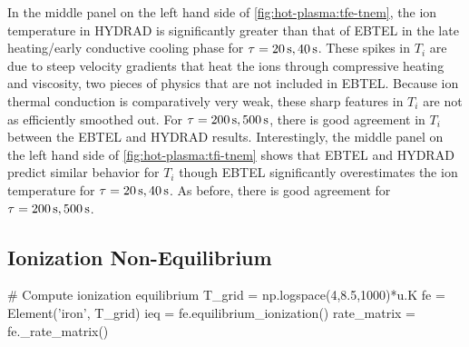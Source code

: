 In the middle panel on the left hand side of \autoref{fig:hot-plasma:tfe-tnem}, the ion temperature in HYDRAD is significantly greater than that of EBTEL in the late heating/early conductive cooling phase for $\tau=\SIlist[list-pair-separator = {, }]{20;40}{\second}$. These spikes in $T_i$ are due to steep velocity gradients that heat the ions through compressive heating and viscosity, two pieces of physics that are not included in EBTEL. Because ion thermal conduction is comparatively very weak, these sharp features in $T_i$ are not as efficiently smoothed out. For $\tau=\SIlist[list-pair-separator = {, }]{200;500}{\second}$, there is good agreement in $T_i$ between the EBTEL and HYDRAD results. Interestingly, the middle panel on the left hand side of \autoref{fig:hot-plasma:tfi-tnem} shows that EBTEL and HYDRAD predict similar behavior for $T_i$ though EBTEL significantly overestimates the ion temperature for $\tau=\SIlist[list-pair-separator = {, }]{20;40}{\second}$. As before, there is good agreement for $\tau=\SIlist[list-pair-separator = {, }]{200;500}{\second}$. 

\subsection{Ionization Non-Equilibrium}\label{hot-plasma:subsec:nei_res}

\begin{pycode}[chapter5]
# Compute ionization equilibrium
T_grid = np.logspace(4,8.5,1000)*u.K
fe = Element('iron', T_grid)
ieq = fe.equilibrium_ionization()
rate_matrix = fe._rate_matrix()
\end{pycode}

